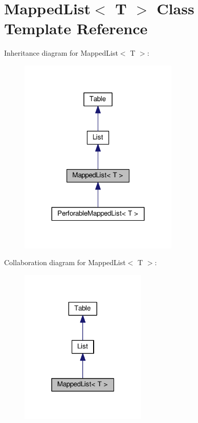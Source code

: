 \hypertarget{classMappedList}{}\section{Mapped\+List$<$ T $>$ Class Template Reference}
\label{classMappedList}


Inheritance diagram for Mapped\+List$<$ T $>$\+:\nopagebreak
\begin{figure}[H]
\begin{center}
\leavevmode
\includegraphics[width=215pt]{classMappedList__inherit__graph}
\end{center}
\end{figure}


Collaboration diagram for Mapped\+List$<$ T $>$\+:\nopagebreak
\begin{figure}[H]
\begin{center}
\leavevmode
\includegraphics[width=171pt]{classMappedList__coll__graph}
\end{center}
\end{figure}
